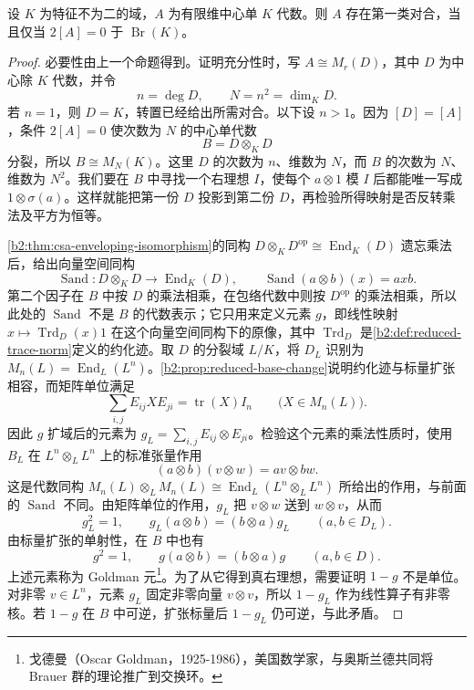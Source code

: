 \begin{theorem}[Albert]\label{b2:thm:B-albert-involution}
	设 \(K\) 为特征不为二的域，\(A\) 为有限维中心单 \(K\) 代数。则 \(A\) 存在第一类对合，当且仅当 \(2[A]=0\) 于 \(\operatorname{Br}(K)\)。
\end{theorem}
\begin{proof}
	必要性由上一个命题得到。证明充分性时，写 \(A\cong M_r(D)\)，其中 \(D\) 为中心除 \(K\) 代数，并令
	\[
		n=\deg D,\qquad N=n^2=\dim_KD.
	\]
	若 \(n=1\)，则 \(D=K\)，转置已经给出所需对合。以下设 \(n>1\)。因为 \([D]=[A]\)，条件 \(2[A]=0\) 使次数为 \(N\) 的中心单代数
	\[
		B=D\otimes_KD
	\]
	分裂，所以 \(B\cong M_N(K)\)。这里 \(D\) 的次数为 \(n\)、维数为 \(N\)，而 \(B\) 的次数为 \(N\)、维数为 \(N^2\)。我们要在 \(B\) 中寻找一个右理想 \(I\)，使每个 \(a\otimes1\) 模 \(I\) 后都能唯一写成 \(1\otimes\sigma(a)\)。这样就能把第一份 \(D\) 投影到第二份 \(D\)，再检验所得映射是否反转乘法及平方为恒等。

	\cref{b2:thm:csa-enveloping-isomorphism}的同构 \(D\otimes_KD^{\mathrm{op}}\cong\operatorname{End}_K(D)\) 遗忘乘法后，给出向量空间同构
	\[
		\operatorname{Sand}:D\otimes_KD\longrightarrow\operatorname{End}_K(D), \qquad \operatorname{Sand}(a\otimes b)(x)=axb.
	\]
	第二个因子在 \(B\) 中按 \(D\) 的乘法相乘，在包络代数中则按 \(D^{\mathrm{op}}\) 的乘法相乘，所以此处的 \(\operatorname{Sand}\) 不是 \(B\) 的代数表示；它只用来定义元素 \(g\)，即线性映射 \(x\mapsto\operatorname{Trd}_D(x)1\) 在这个向量空间同构下的原像，其中 \(\operatorname{Trd}_D\) 是\cref{b2:def:reduced-trace-norm}定义的约化迹。取 \(D\) 的分裂域 \(L/K\)，将 \(D_L\) 识别为 \(M_n(L)=\operatorname{End}_L(L^n)\)。\cref{b2:prop:reduced-base-change}说明约化迹与标量扩张相容，而矩阵单位满足
	\[
		\sum_{i,j}E_{ij}XE_{ji}=\operatorname{tr}(X)I_n \qquad\bigl(X\in M_n(L)\bigr).
	\]
	因此 \(g\) 扩域后的元素为 \(g_L=\sum_{i,j}E_{ij}\otimes E_{ji}\)。检验这个元素的乘法性质时，使用 \(B_L\) 在 \(L^n\otimes_LL^n\) 上的标准张量作用
	\[
		(a\otimes b)(v\otimes w)=av\otimes bw.
	\]
	这是代数同构 \(M_n(L)\otimes_LM_n(L)\cong\operatorname{End}_L(L^n\otimes_LL^n)\) 所给出的作用，与前面的 \(\operatorname{Sand}\) 不同。由矩阵单位的作用，\(g_L\) 把 \(v\otimes w\) 送到 \(w\otimes v\)，从而
	\[
		g_L^2=1,\qquad g_L(a\otimes b)=(b\otimes a)g_L \qquad(a,b\in D_L).
	\]
	由标量扩张的单射性，在 \(B\) 中也有
	\[
		g^2=1,\qquad g(a\otimes b)=(b\otimes a)g \qquad(a,b\in D).
	\]
	上述元素称为 Goldman 元\footnote{戈德曼（Oscar Goldman，1925-1986），美国数学家，与奥斯兰德共同将 Brauer 群的理论推广到交换环。}。为了从它得到真右理想，需要证明 \(1-g\) 不是单位。对非零 \(v\in L^n\)，元素 \(g_L\) 固定非零向量 \(v\otimes v\)，所以 \(1-g_L\) 作为线性算子有非零核。若 \(1-g\) 在 \(B\) 中可逆，扩张标量后 \(1-g_L\) 仍可逆，与此矛盾。


\end{proof}
